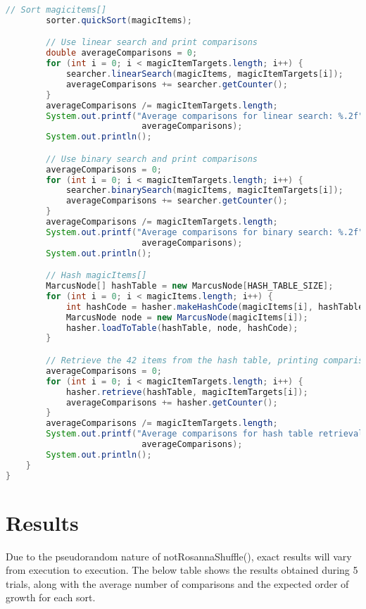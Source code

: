 \documentclass[letterpaper, 10pt]{article}
\begin{document}
\begin{lstlisting}[language=Java]
        // Sort magicitems[]
        sorter.quickSort(magicItems);

        // Use linear search and print comparisons
        double averageComparisons = 0;
        for (int i = 0; i < magicItemTargets.length; i++) {
            searcher.linearSearch(magicItems, magicItemTargets[i]);
            averageComparisons += searcher.getCounter();
        }
        averageComparisons /= magicItemTargets.length;
        System.out.printf("Average comparisons for linear search: %.2f",
                           averageComparisons);
        System.out.println();

        // Use binary search and print comparisons
        averageComparisons = 0;
        for (int i = 0; i < magicItemTargets.length; i++) {
            searcher.binarySearch(magicItems, magicItemTargets[i]);
            averageComparisons += searcher.getCounter();
        }
        averageComparisons /= magicItemTargets.length;
        System.out.printf("Average comparisons for binary search: %.2f",
                           averageComparisons);
        System.out.println();

        // Hash magicItems[]
        MarcusNode[] hashTable = new MarcusNode[HASH_TABLE_SIZE];
        for (int i = 0; i < magicItems.length; i++) {
            int hashCode = hasher.makeHashCode(magicItems[i], hashTable.length);
            MarcusNode node = new MarcusNode(magicItems[i]);
            hasher.loadToTable(hashTable, node, hashCode);
        }

        // Retrieve the 42 items from the hash table, printing comparisons
        averageComparisons = 0;
        for (int i = 0; i < magicItemTargets.length; i++) {
            hasher.retrieve(hashTable, magicItemTargets[i]);
            averageComparisons += hasher.getCounter();
        }
        averageComparisons /= magicItemTargets.length;
        System.out.printf("Average comparisons for hash table retrieval: %.2f",
                           averageComparisons);
        System.out.println();
    }
}
\end{lstlisting}

\section{Results}

\hspace{1.0em}Due to the pseudorandom nature of notRosannaShuffle(), exact results will vary from execution to execution. The below table shows the results obtained during 5 trials, along with the average number of comparisons and the expected order of growth for each sort.
\end{document}

